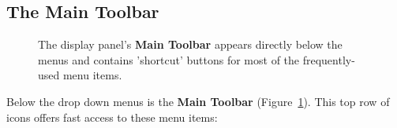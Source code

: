 \subsection{The Main Toolbar}
\label{section:display.viewerGUI.displaypanel.maintoolbar}

\begin{figure}[h!]
\begin{center}
\caption{\label{fig:viewer_maintoolbar} The display panel's
{\bf Main Toolbar} appears directly below the menus and contains
'shortcut' buttons for most of the frequently-used menu items.}
\hrulefill
\end{center}
\end{figure}

Below the drop down menus is the {\bf Main Toolbar} (Figure~\ref{fig:viewer_maintoolbar}).
This top row of icons offers fast access to these menu items:
